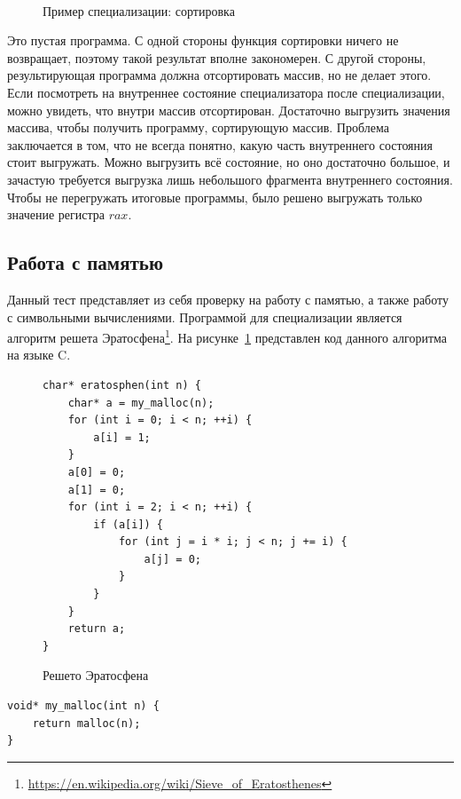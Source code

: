 \begin{figure}[!t]
\centering
{} \\
\caption{Пример специализации: сортировка}
\end{figure}


Это пустая программа. С одной стороны функция сортировки ничего не возвращает, поэтому такой результат вполне закономерен. С другой стороны, результирующая программа должна отсортировать массив, но не делает этого. Если посмотреть на внутреннее состояние специализатора после специализации, можно увидеть, что внутри массив отсортирован. Достаточно выгрузить значения массива, чтобы получить программу, сортирующую массив. Проблема заключается в том, что не всегда понятно, какую часть внутреннего состояния стоит выгружать. Можно выгрузить всё состояние, но оно достаточно большое, и зачастую требуется выгрузка лишь небольшого фрагмента внутреннего состояния. Чтобы не перегружать итоговые программы, было решено выгружать только значение регистра $rax$. 

\subsection{ Работа с памятью}

Данный тест представляет из себя проверку на работу с памятью, а также работу с символьными вычислениями. Программой для специализации является алгоритм решета Эратосфена\footnote{\url{https://en.wikipedia.org/wiki/Sieve_of_Eratosthenes}}. На рисунке~\ref{fig:era} представлен код данного алгоритма на языке \textsf{C}.
\begin{figure}[t]
\begin{lstlisting}[xleftmargin = 20pt]
char* eratosphen(int n) {
    char* a = my_malloc(n);
    for (int i = 0; i < n; ++i) {
        a[i] = 1;
    }
    a[0] = 0;
    a[1] = 0;
    for (int i = 2; i < n; ++i) {
        if (a[i]) {
            for (int j = i * i; j < n; j += i) {
                a[j] = 0;
            }
        }
    }
    return a;
}
\end{lstlisting}
\caption{ Решето Эратосфена}
\label{fig:era}
\end{figure}

\newsavebox\boxel
\begin{lrbox}{\boxel}
\begin{lstlisting}[xleftmargin = 20pt]
void* my_malloc(int n) {
    return malloc(n);
}
\end{lstlisting}
\end{lrbox}

